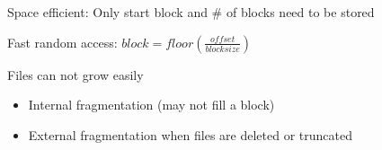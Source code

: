 \begin{slide}
    

    Space efficient: Only start block and \# of blocks need to be stored
    \bigskip

    Fast random access: $block = floor(\frac{offset}{blocksize})$
    \bigskip

    Files can not grow easily
	\begin{itemize}
		\item Internal fragmentation (may not fill a block)
		\item External fragmentation when files are deleted or truncated
	\end{itemize}
	
\end{slide}

